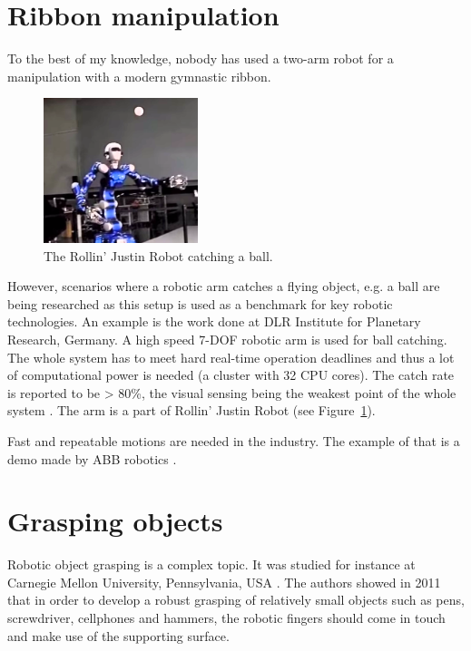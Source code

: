     \section{Ribbon manipulation}
        To the best of my knowledge, nobody has used a two-arm robot for a manipulation with a modern gymnastic ribbon.

        \begin{figure}[h]
        \includegraphics[width=0.4\textwidth]{Justine.png}
        \centering
        \caption{The Rollin' Justin Robot catching a ball.}
        \label{fig:Justine}
        \end{figure}

        However, scenarios where a robotic arm catches a flying object, e.g. a ball are being researched as this setup is used as a benchmark for key robotic technologies. An example is the work done at DLR Institute for Planetary Research, Germany. A high speed 7-DOF robotic arm is used for ball catching. The whole system has to meet hard real-time operation deadlines and thus a lot of computational power is needed (a cluster with 32 CPU cores). The catch rate is reported to be > 80\%, the visual sensing being the weakest point of the whole system \cite{FastBallCatching}. The arm is a part of Rollin' Justin Robot \cite{FastBallCatchingVideo} (see Figure~\ref{fig:Justine}).

        Fast and repeatable motions are needed in the industry. The example of that is a demo made by ABB robotics \cite{CanChallengeVideo}.

    \section{Grasping objects}
        Robotic object grasping is a complex topic. It was studied for instance at Carnegie Mellon University, Pennsylvania, USA \cite{kazemi2012robust}. The authors showed in 2011 that in order to develop a robust grasping of relatively small objects such as pens, screwdriver, cellphones and hammers, the robotic fingers should come in touch and make use of the supporting surface.

